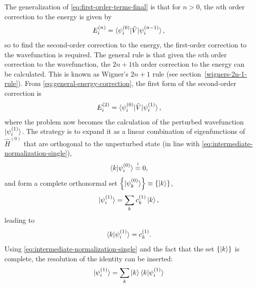 \documentclass[%
class = book,%
crop = false,%
float = true,%
multi = true,%
preview = false,%
]{standalone}
\begin{document}
The generalization of \eqref{eq:first-order-terms-final} is that for \(n > 0\), the \(n\)th order correction to the energy is given by
\begin{equation}
  \label{eq:general-energy-correction}
  E_{i}^{(n)} = \braket{\psi_{i}^{(0)}|\hat{V}|\psi_{i}^{(n-1)}},
\end{equation}
so to find the second-order correction to the energy, the first-order correction to the wavefunction is required. The general rule is that given the \(n\)th order correction to the wavefunction, the \(2n+1\)th order correction to the energy can be calculated. This is known as Wigner's \(2n+1\) rule (see section~\ref{wigners-2n-1-rule}). From \eqref{eq:general-energy-correction}, the first form of the second-order correction is
\begin{equation}
  \label{eq:second-order-correction-first-form}
  E_{i}^{(2)} = \braket{\psi_{i}^{(0)}|\hat{V}|\psi_{i}^{(1)}},
\end{equation}
where the problem now becomes the calculation of the perturbed wavefunction \(\ket{\psi_{i}^{(1)}}\). The strategy is to expand it as a linear combination of eigenfunctions of \(\hat{H}^{(0)}\) that are orthogonal to the unperturbed state (in line with \eqref{eq:intermediate-normalization-single}),
\begin{equation}
  \label{eq:orthogonal-to-reference-state}
  \braket{k|\psi_{i}^{(0)}} \overset{!}{=} 0,
\end{equation}
and form a complete orthonormal set \(\left\{\ket{\psi_{k}^{(0)}}\right\} \equiv \left\{\ket{k}\right\}\),
\begin{equation}
  \label{eq:orthonormal-eigenfunction-expansion}
  \ket{\psi_{i}^{(1)}} = \sum_{k} c_{k}^{(1)} \ket{k},
\end{equation}
leading to
\begin{equation}
  \label{eq:coefficient-selection}
  \braket{k|\psi_{i}^{(1)}} = c_{k}^{(1)}.
\end{equation}
Using \eqref{eq:intermediate-normalization-single} and the fact that the set \(\{\ket{k}\}\) is complete, the resolution of the identity can be inserted:
\begin{equation}
  \label{eq:resolution-of-the-identity}
  \ket{\psi_{i}^{(1)}} = \sum_{k} \ket{k} \braket{k|\psi_{i}^{(1)}}
\end{equation}
\end{document}

